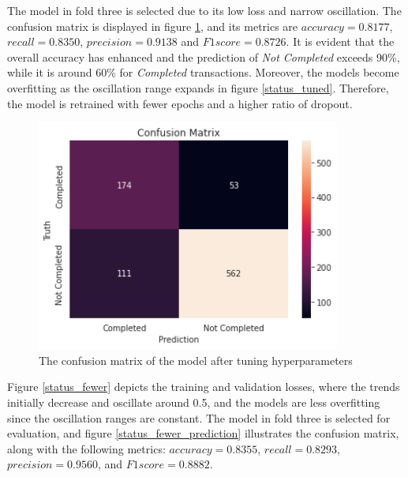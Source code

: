 \documentclass[12pt,twoside]{report}
\begin{document}
The model in fold three is selected due to its low loss and narrow oscillation. The confusion matrix is displayed in figure \ref{status_tuned_prediction}, and its metrics are $accuracy = 0.8177$, $recall = 0.8350$, $precision = 0.9138$ and $F1 score = 0.8726$. It is evident that the overall accuracy has enhanced and the prediction of \textit{Not Completed} exceeds 90\%, while it is around 60\% for \textit{Completed} transactions. Moreover, the models become overfitting as the oscillation range expands in figure \ref{status_tuned}. Therefore, the model is retrained with fewer epochs and a higher ratio of dropout. 
\\

\begin{figure}[!htbp]
	\centering
	\includegraphics[width=10cm]{cm_tuned}
	\caption{The confusion matrix of the model after tuning hyperparameters}
	\label{status_tuned_prediction}
\end{figure}

Figure \ref{status_fewer} depicts the training and validation losses, where the trends initially decrease and oscillate around 0.5, and the models are less overfitting since the oscillation ranges are constant. The model in fold three is selected for evaluation, and figure \ref{status_fewer_prediction} illustrates the confusion matrix, along with the following metrics: $accuracy = 0.8355$, $recall = 0.8293$, $precision = 0.9560$, and $F1 score = 0.8882$. 
\\
\end{document}
